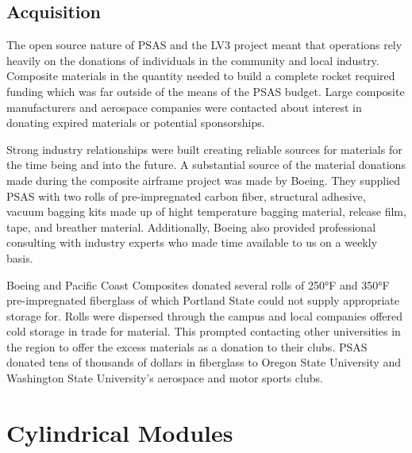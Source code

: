 \documentclass{aiaa-tc}%
\begin{document}
\subsection{Acquisition}
The open source nature of PSAS and the LV3 project meant that operations rely heavily on the donations of individuals in the community and local industry. Composite materials in the quantity needed to build a complete rocket required funding which was far outside of the means of the PSAS budget. Large composite manufacturers and aerospace companies were contacted about interest in donating expired materials or potential sponsorships. 

Strong industry relationships were built creating reliable sources for materials for the time being and into the future. A substantial source of the material donations made during the composite airframe project was made by Boeing. They supplied PSAS with two rolls of pre-impregnated carbon fiber, structural adhesive, vacuum bagging kits made up of hight temperature bagging material, release film, tape, and breather material. Additionally, Boeing also provided professional consulting with industry experts who made time available to us on a weekly basis. 

Boeing and Pacific Coast Composites donated several rolls of 250°F and 350°F pre-impregnated fiberglass of which Portland State could not supply appropriate storage for. Rolls were dispersed through the campus and local companies offered cold storage in trade for material. This prompted contacting other universities in the region to offer the excess materials as a donation to their clubs. PSAS donated tens of thousands of dollars in fiberglass to Oregon State University and Washington State University's aerospace and motor sports clubs. 

\section{Cylindrical Modules}\label{sec:modules}
\end{document}
